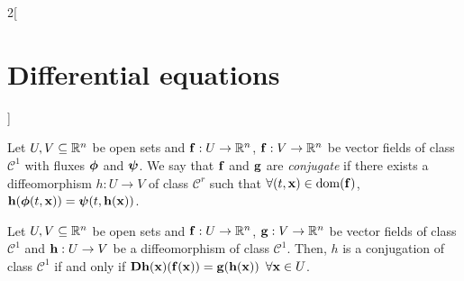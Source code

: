\documentclass[../../../main.tex]{subfiles}
\begin{document}
\begin{multicols}{2}[\section{Differential equations}]
\begin{definition}
  \end{definition}
  \begin{definition}
    Let $U,V\subseteq \mathbb{R}^n$ be open sets and $\boldsymbol{\mathrm{f}}:U\rightarrow\mathbb{R}^n$, $\boldsymbol{\mathrm{f}}:V\rightarrow\mathbb{R}^n$ be vector fields of class $\mathcal{C}^1$ with fluxes $\boldsymbol{\mathrm{\phi}}$ and $\boldsymbol{\mathrm{\psi}}$. We say that $\boldsymbol{\mathrm{f}}$ and $\boldsymbol{\mathrm{g}}$ are \textit{conjugate} if there exists a diffeomorphism $h:U\rightarrow V$ of class $\mathcal{C}^r$ such that $\forall (t,\boldsymbol{\mathrm{x}})\in \operatorname{dom}(\boldsymbol{\mathrm{f}})$, $\boldsymbol{\mathrm{h}}(\boldsymbol{\mathrm{\phi}}(t,\boldsymbol{\mathrm{x}}))=\boldsymbol{\mathrm{\psi}}(t,\boldsymbol{\mathrm{h}}(\boldsymbol{\mathrm{x}}))$.
  \end{definition}
  \begin{lemma}
    Let $U,V\subseteq \mathbb{R}^n$ be open sets and $\boldsymbol{\mathrm{f}}:U\rightarrow\mathbb{R}^n$, $\boldsymbol{\mathrm{g}}:V\rightarrow\mathbb{R}^n$ be vector fields of class $\mathcal{C}^1$ and $\boldsymbol{\mathrm{h}}:U\rightarrow V$ be a diffeomorphism of class $\mathcal{C}^1$. Then, $h$ is a conjugation of class $\mathcal{C}^1$ if and only if $\boldsymbol{\mathrm{Dh}}(\boldsymbol{\mathrm{x}})(\boldsymbol{\mathrm{f}}(\boldsymbol{\mathrm{x}}))=\boldsymbol{\mathrm{g}}(\boldsymbol{\mathrm{h}}(\boldsymbol{\mathrm{x}}))$ $\forall \boldsymbol{\mathrm{x}}\in U$.
  \end{lemma}

\end{multicols}
\end{document}
